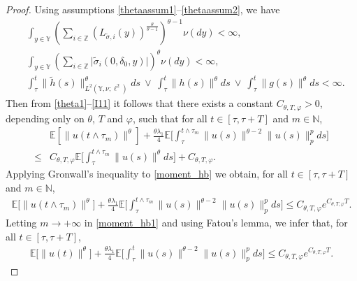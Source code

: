 \documentclass[11pt]{article}
\numberwithin{equation}{section}
\theoremstyle{plain}
\begin{document}
\begin{proof}
 Using assumptions \eqref{thetaassum1}–\eqref{thetaassum2}, we have
\begin{align*}
      &  
                \int_{
                y\in \mathbb{Y}
                }
	                     \left( \sum_{i \in \mathbb Z} ( L_{\tilde\sigma,i}(y) )^{\frac{\theta}{\theta-1}}
	                    \right)^{\theta-1}
	             \nu(dy) 
	        < \infty,  \nonumber\\
      &	 
            	\int_{y\in\mathbb{Y}
            	} 
	                 \left( \sum_{i \in \mathbb{Z}}
                                	\big| \widetilde{\sigma}_{i}(0, \delta_0, y) \big|
                 	\right)^{\theta} \nu(dy)
	       < \infty, \nonumber\\
      & \int_{\tau}^{t}  
	             \big\| \widetilde{h}(s)\big\|
	             ^{\theta} _{	 
  L^2(  \mathbb{Y}, \nu; \ell^2)}ds
	      \ \vee\ 
	      \int_{\tau}^{t}  
                 \big\| h(s) \big\|^{\theta} ds
          \ \vee \ 
		  \int_{\tau}^{t} 
   	             \big\| g(s) \big\|^{\theta} ds
	       < \infty. 
\end{align*}
Then from \eqref{theta1}–\eqref{I11} it follows that there exists a constant 
$C_{\theta,T,\varphi}>0$, depending only on $\theta$, $T$ and $\varphi$, such that
for all $t\in[\tau,\tau+T]$ and $m\in\mathbb{N}$,
\begin{align}\label{moment_hb}
	  & \mathbb{E} \left[ \|u(t \wedge \tau_m)\|^{\theta} \right]
          + \frac{\theta \lambda_1}{4} 
       	           \mathbb{E} 
       	                  \bigg[ \int_{\tau}^{t \wedge \tau_m}
	                                      \|u(s)\|^{\theta-2} \|u(s)\|_p^p ds 
	                      \bigg]  \nonumber\\
\le & C_{\theta, T, \varphi}
	       \mathbb{E}
	               \bigg[ \int_{\tau}^{t \wedge \tau_m} 
	                               \|u(s)\|^{\theta} ds 
	               \bigg]
	        + C_{\theta,T,\varphi}.
\end{align}
Applying Gronwall's inequality to \eqref{moment_hb} we obtain, for all
$t\in[\tau,\tau+T]$ and $m\in\mathbb{N}$,
\begin{align}\label{moment_hb1}
	\mathbb{E}\big[ \|u(t \wedge \tau_m)\|^{\theta} \big]
	  + \frac{\theta \lambda_1}{4} 
       	           \mathbb{E} 
       	                  \bigg[ \int_{\tau}^{t \wedge \tau_m}
	                                      \|u(s)\|^{\theta-2} \|u(s)\|_p^p ds 
	                      \bigg]   
	\le C_{\theta,T,\varphi} e^{C_{\theta,T,\varphi} T}.
\end{align}
Letting $m \to +\infty$ in \eqref{moment_hb1} and using Fatou's lemma, we infer
that, for all $t \in [\tau,\tau+T]$,
\begin{align}\label{moment_hb2}
	\mathbb{E}\big[ \|u(t)\|^{\theta} \big]
	  + \frac{\theta \lambda_1}{4} 
       	           \mathbb{E} 
       	                  \bigg[ \int_{\tau}^{t}
	                                      \|u(s)\|^{\theta-2} \|u(s)\|_p^p ds 
	                      \bigg]   
	\le C_{\theta,T,\varphi} e^{C_{\theta,T,\varphi} T}.
\end{align}


\end{proof}
\end{document}
